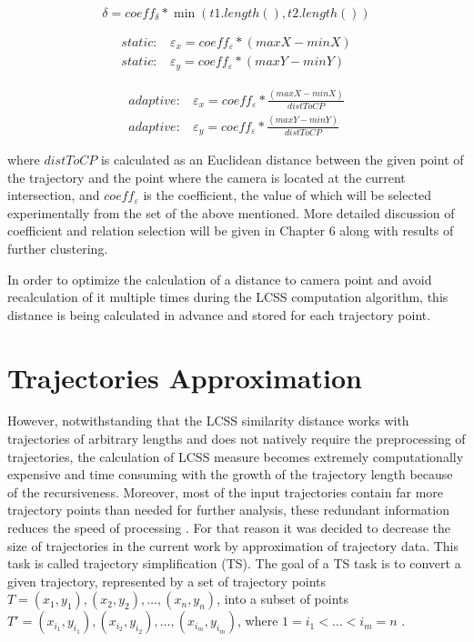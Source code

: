 \begin{equation} \label{eq:delta-adapt}
	\delta = coeff_\delta * \min{(t1.length(), t2.length())}
\end{equation}

\begin{subequations} \label{eq:epsXY-st}
	\begin{align}
		static:\ \ \ \ \varepsilon_x = coeff_\varepsilon * (maxX - minX) \\
		static:\ \ \ \ \varepsilon_y = coeff_\varepsilon * (maxY - minY)
	\end{align}
\end{subequations}

\begin{subequations} \label{eq:epsXY-adapt}
	\begin{align}
		adaptive:\ \ \ \ \varepsilon_x = coeff_\varepsilon * \frac{(maxX - minX)}{distToCP} \\
		adaptive:\ \ \ \ \varepsilon_y = coeff_\varepsilon * \frac{(maxY - minY)}{distToCP}
	\end{align}
\end{subequations}

where $distToCP$ is calculated as an Euclidean distance between the given point of the trajectory and the point where the camera is located at the current intersection, and $coeff_\varepsilon$ is the coefficient, the value of which will be selected experimentally from the set of the above mentioned. More detailed discussion of coefficient and relation selection will be given in Chapter 6 along with results of further clustering.

In order to optimize the calculation of a distance to camera point and avoid recalculation of it multiple times during the LCSS computation algorithm, this distance is being calculated in advance and stored for each trajectory point.

\section{Trajectories Approximation}

However, notwithstanding that the LCSS similarity distance works with trajectories of arbitrary lengths and does not natively require the preprocessing of trajectories, the calculation of LCSS measure becomes extremely computationally expensive and time consuming with the growth of the trajectory length because of the recursiveness. Moreover, most of the input trajectories contain far more trajectory points than needed for further analysis, these redundant information reduces the speed of processing \cite{article:multir_pol_appr}. For that reason it was decided to decrease the size of trajectories in the current work by approximation of trajectory data. This task is called trajectory simplification (TS). The goal of a TS task is to convert a given trajectory, represented by a set of trajectory points $T = {(x_1, y_1), (x_2, y_2), \ldots, (x_n, y_n)}$, into a subset of points $T' = {(x_{i_1}, y_{i_1}), (x_{i_2}, y_{i_2}), \ldots, (x_{i_m}, y_{i_m})}$, where $1 = i_1 < \ldots < i_m = n$ \cite{article:multir_pol_appr}.

